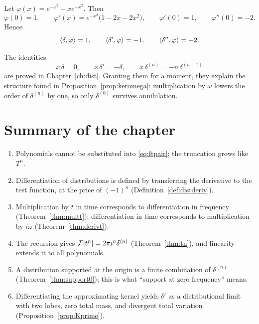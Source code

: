 \begin{example}\label{ex:delta-prime-test}
Let $\varphi(x)=e^{-x^{2}}+xe^{-x^{2}}$. Then
\begin{equation}
\varphi(0)=1,\qquad
\varphi'(x)=e^{-x^{2}}\big(1-2x-2x^{2}\big),\qquad
\varphi'(0)=1,\qquad
\varphi''(0)=-2 .
\end{equation}
Hence
\begin{equation}
\langle \delta,\varphi\rangle=1,\qquad
\langle \delta',\varphi\rangle=-1,\qquad
\langle \delta'',\varphi\rangle=-2 .
\end{equation}
\end{example}

\begin{example}\label{ex:ladder}
The identities
\begin{equation}
x\,\delta=0,\qquad
x\,\delta'=-\delta,\qquad
x\,\delta^{(n)}=-n\,\delta^{(n-1)}
\label{eq:xdeltan}
\end{equation}
are proved in Chapter~\ref{ch:dist}. Granting them for a moment, they explain the structure found in
Proposition~\ref{prop:keromega}: multiplication by $\omega$ lowers the order of $\delta^{(n)}$ by
one, so only $\delta^{(0)}$ survives annihilation.
\end{example}

\section{Summary of the chapter}

\begin{enumerate}
\item Polynomials cannot be substituted into \eqref{eq:ftpair}; the truncation grows like $T^{n}$.
\item Differentiation of distributions is defined by transferring the derivative to the test
function, at the price of $(-1)^{n}$ (Definition~\ref{def:distderiv}).
\item Multiplication by $t$ in time corresponds to differentiation in frequency
(Theorem~\ref{thm:multt}); differentiation in time corresponds to multiplication by $i\omega$
(Theorem~\ref{thm:derivt}).
\item The recursion gives $\mathcal{F}[t^{n}]=2\pi i^{n}\delta^{(n)}$
(Theorem~\ref{thm:tn}), and linearity extends it to all polynomials.
\item A distribution supported at the origin is a finite combination of $\delta^{(n)}$
(Theorem~\ref{thm:support0}); this is what ``support at zero frequency'' means.
\item Differentiating the approximating kernel yields $\delta'$ as a distributional limit with two
lobes, zero total mass, and divergent total variation
(Proposition~\ref{prop:Kprime}).
\end{enumerate}

